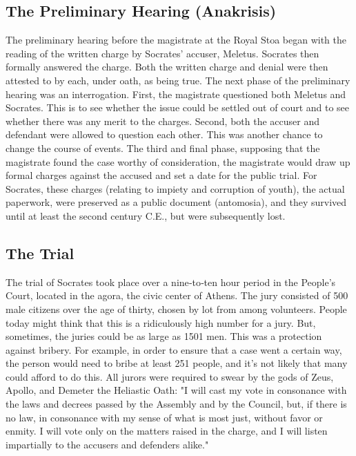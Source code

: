 \subsection{The Preliminary Hearing (Anakrisis)}

The preliminary hearing before the magistrate at the Royal Stoa began with the reading of the written charge by Socrates' accuser, Meletus. Socrates then formally answered the charge. Both the written charge and denial were then attested to by each, under oath, as being true. The next phase of the preliminary hearing was an interrogation. First, the magistrate questioned both Meletus and Socrates. This is to see whether the issue could be settled out of court and to see whether there was any merit to the charges. Second, both the accuser and defendant were allowed to question each other. This was another chance to change the course of events. The third and final phase, supposing that the magistrate found the case worthy of consideration, the magistrate would draw up formal charges against the accused and set a date for the public trial. For Socrates, these charges (relating to impiety and corruption of youth), the actual paperwork, were preserved as a public document (antomosia), and they survived until at least the second century C.E., but were subsequently lost. 
\subsection{The Trial}

The trial of Socrates took place over a nine‐to‐ten hour period in the People's Court, located in the agora, the civic center of Athens. The jury consisted of 500 male citizens over the age of thirty, chosen by lot from among volunteers. People today might think that this is a ridiculously high number for a jury.  But, sometimes, the juries could be as large as 1501 men. This was a protection against bribery. For example, in order to ensure that a case went a certain way, the person would need to bribe at least 251 people, and it's not likely that many could afford to do this.  All jurors were required to swear by the gods of Zeus, Apollo, and Demeter the Heliastic Oath: "I will cast my vote in consonance with the laws and decrees passed by the Assembly and by the Council, but, if there is no law, in consonance with my sense of what is most just, without favor or enmity. I will vote only on the matters raised in the charge, and I will listen impartially to the accusers and defenders alike."

